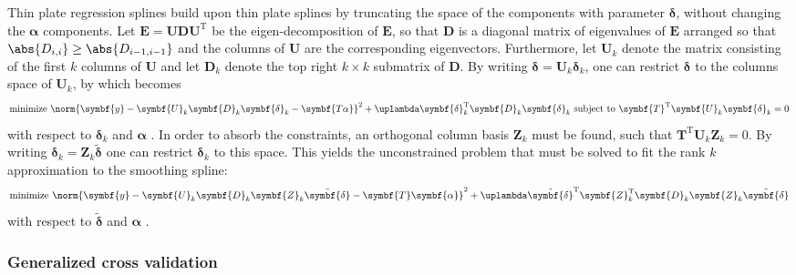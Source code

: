 Thin plate regression splines build upon thin plate splines by truncating the space of the components with parameter \(\symbf{\delta}\), without changing the \(\symbf{\alpha}\) components.  Let \(\symbf{E} = \symbf{U D U}^{\text{T}}\) be the eigen-decomposition of \(\symbf{E}\), so that \(\symbf{D}\) is a diagonal matrix of eigenvalues of \(\symbf{E}\) arranged so that \(\abs{D_{i, i}} \geq \abs{D_{i - 1, i - 1}}\) and the columns of \(\symbf{U}\) are the corresponding eigenvectors. Furthermore, let \(\symbf{U}_k\) denote the matrix consisting of the first \(k\) columns of \(\symbf{U}\) and let \(\symbf{D}_k\) denote the top right \(k \times k\) submatrix of \(\symbf{D}\).  By writing \(\symbf{\delta} = \symbf{U}_k \symbf{\delta}_k\), one can restrict \(\symbf{\delta}\) to the columns space of \(\symbf{U}_k\), by which  becomes
\begin{equation}
  \label{eq:ThinPlateRegressionSplinesSimplifiedFittingProblem}
  \text{minimize } \norm{\symbf{y} - \symbf{U}_k\symbf{D}_k\symbf{\delta}_k - \symbf{T \alpha}}^2 + \uplambda \symbf{\delta}_k^{\text{T}} \symbf{D}_k \symbf{\delta}_k \text{ subject to } \symbf{T}^{\text{T}} \symbf{U}_k \symbf{\delta}_k = 0
\end{equation}
with respect to \(\symbf{\delta}_k\) and \(\symbf{\alpha}\) \parencite{Wood2006}.  In order to absorb the constraints, an orthogonal column basis \(\symbf{Z}_k\) must be found, such that \(\symbf{T}^{\text{T}} \symbf{U}_k \symbf{Z}_k = 0\).  By writing \(\symbf{\delta}_k = \symbf{Z}_k \tilde{\symbf{\delta}}\) one can restrict \(\symbf{\delta}_k\) to this space.  This yields the unconstrained problem that must be solved to fit the rank \(k\) approximation to the smoothing spline:
\begin{equation}
  \label{eq:ThinPlateRegressionSplinesUnconstrainedFittingProblem}
  \text{minimize } \norm{\symbf{y} - \symbf{U}_k \symbf{D}_k \symbf{Z}_k \tilde{\symbf{\delta}} - \symbf{T} \symbf{\alpha}}^2 + \uplambda \tilde{\symbf{\delta}}^{\text{T}} \symbf{Z}_k^{\text{T}} \symbf{D}_k \symbf{Z}_k \tilde{\symbf{\delta}}
\end{equation}
with respect to \(\tilde{\symbf{\delta}}\) and \(\symbf{\alpha}\) \parencite{Wood2006}.

\subsubsection{Generalized cross validation}

